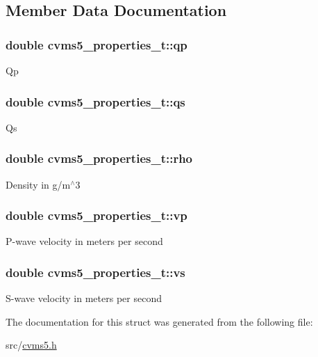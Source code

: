 \subsection{Member Data Documentation}
\hypertarget{structcvms5__properties__t_ac6e2000ffa6cd393a352390e16808afb}{
\subsubsection[{qp}]{\setlength{\rightskip}{0pt plus 5cm}double cvms5\+\_\+properties\+\_\+t\+::qp}}\label{structcvms5__properties__t_ac6e2000ffa6cd393a352390e16808afb}
Qp \hypertarget{structcvms5__properties__t_a6a0eff66f0e8ac953db5c97243054ac7}{
\subsubsection[{qs}]{\setlength{\rightskip}{0pt plus 5cm}double cvms5\+\_\+properties\+\_\+t\+::qs}}\label{structcvms5__properties__t_a6a0eff66f0e8ac953db5c97243054ac7}
Qs \hypertarget{structcvms5__properties__t_a6d5e01c69dc8c6d01d83b80be8cd6fa6}{
\subsubsection[{rho}]{\setlength{\rightskip}{0pt plus 5cm}double cvms5\+\_\+properties\+\_\+t\+::rho}}\label{structcvms5__properties__t_a6d5e01c69dc8c6d01d83b80be8cd6fa6}
Density in g/m$^\wedge$3 \hypertarget{structcvms5__properties__t_acb095810eaf9bcc23e4c66de57c31a1d}{
\subsubsection[{vp}]{\setlength{\rightskip}{0pt plus 5cm}double cvms5\+\_\+properties\+\_\+t\+::vp}}\label{structcvms5__properties__t_acb095810eaf9bcc23e4c66de57c31a1d}
P-\/wave velocity in meters per second \hypertarget{structcvms5__properties__t_a2f479c09fbbb41f531de68ca4c354c32}{
\subsubsection[{vs}]{\setlength{\rightskip}{0pt plus 5cm}double cvms5\+\_\+properties\+\_\+t\+::vs}}\label{structcvms5__properties__t_a2f479c09fbbb41f531de68ca4c354c32}
S-\/wave velocity in meters per second 

The documentation for this struct was generated from the following file\+:\begin{DoxyCompactItemize}
\item 
src/\hyperlink{cvms5_8h}{cvms5.\+h}\end{DoxyCompactItemize}
